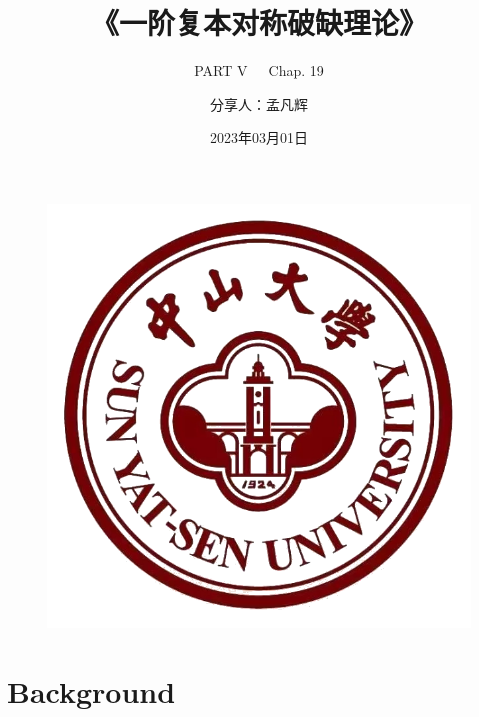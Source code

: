 \documentclass[UTF8]{beamer}
\author{分享人：孟凡辉 }
\title{《一阶复本对称破缺理论》}
\subtitle{PART V~~~Chap. 19}
\institute{中山大学    \textrm{COIN Lab}}
\date{\textrm{2023}年\textrm{03}月\textrm{01}日}
\begin{document}
\kaishu

\begin{frame}
  \titlepage
  \begin{figure}[htpb]
    \begin{center}
      \includegraphics[width=0.2\linewidth]{pic/SYSU_Log.jpg}
    \end{center}
  \end{figure}
\end{frame}

\begin{frame}
  \tableofcontents[sectionstyle=show,subsectionstyle=show/shaded/hide,subsubsectionstyle=show/shaded/hide]
\end{frame}


\section{Background}
\end{document}
